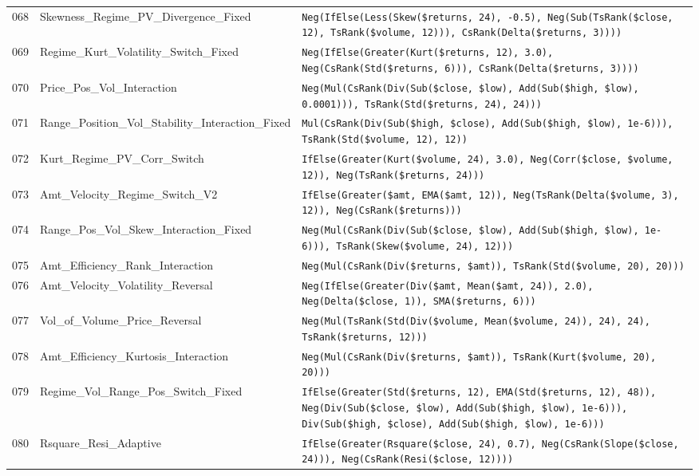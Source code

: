 \begin{longtable}{@{}llp{}@{}}
068 & Skewness\_Regime\_PV\_Divergence\_Fixed & \texttt{Neg(IfElse(Less(Skew(\$returns, 24), -0.5), Neg(Sub(TsRank(\$close, 12), TsRank(\$volume, 12))), CsRank(Delta(\$returns, 3))))} \\
069 & Regime\_Kurt\_Volatility\_Switch\_Fixed & \texttt{Neg(IfElse(Greater(Kurt(\$returns, 12), 3.0), Neg(CsRank(Std(\$returns, 6))), CsRank(Delta(\$returns, 3))))} \\
070 & Price\_Pos\_Vol\_Interaction & \texttt{Neg(Mul(CsRank(Div(Sub(\$close, \$low), Add(Sub(\$high, \$low), 0.0001))), TsRank(Std(\$returns, 24), 24)))} \\
071 & Range\_Position\_Vol\_Stability\_Interaction\_Fixed & \texttt{Mul(CsRank(Div(Sub(\$high, \$close), Add(Sub(\$high, \$low), 1e-6))), TsRank(Std(\$volume, 12), 12))} \\
072 & Kurt\_Regime\_PV\_Corr\_Switch & \texttt{IfElse(Greater(Kurt(\$volume, 24), 3.0), Neg(Corr(\$close, \$volume, 12)), Neg(TsRank(\$returns, 24)))} \\
073 & Amt\_Velocity\_Regime\_Switch\_V2 & \texttt{IfElse(Greater(\$amt, EMA(\$amt, 12)), Neg(TsRank(Delta(\$volume, 3), 12)), Neg(CsRank(\$returns)))} \\
074 & Range\_Pos\_Vol\_Skew\_Interaction\_Fixed & \texttt{Neg(Mul(CsRank(Div(Sub(\$close, \$low), Add(Sub(\$high, \$low), 1e-6))), TsRank(Skew(\$volume, 24), 12)))} \\
075 & Amt\_Efficiency\_Rank\_Interaction & \texttt{Neg(Mul(CsRank(Div(\$returns, \$amt)), TsRank(Std(\$volume, 20), 20)))} \\
076 & Amt\_Velocity\_Volatility\_Reversal & \texttt{Neg(IfElse(Greater(Div(\$amt, Mean(\$amt, 24)), 2.0), Neg(Delta(\$close, 1)), SMA(\$returns, 6)))} \\
077 & Vol\_of\_Volume\_Price\_Reversal & \texttt{Neg(Mul(TsRank(Std(Div(\$volume, Mean(\$volume, 24)), 24), 24), TsRank(\$returns, 12)))} \\
078 & Amt\_Efficiency\_Kurtosis\_Interaction & \texttt{Neg(Mul(CsRank(Div(\$returns, \$amt)), TsRank(Kurt(\$volume, 20), 20)))} \\
079 & Regime\_Vol\_Range\_Pos\_Switch\_Fixed & \texttt{IfElse(Greater(Std(\$returns, 12), EMA(Std(\$returns, 12), 48)), Neg(Div(Sub(\$close, \$low), Add(Sub(\$high, \$low), 1e-6))), Div(Sub(\$high, \$close), Add(Sub(\$high, \$low), 1e-6)))} \\
080 & Rsquare\_Resi\_Adaptive & \texttt{IfElse(Greater(Rsquare(\$close, 24), 0.7), Neg(CsRank(Slope(\$close, 24))), Neg(CsRank(Resi(\$close, 12))))} \\

\end{longtable}
